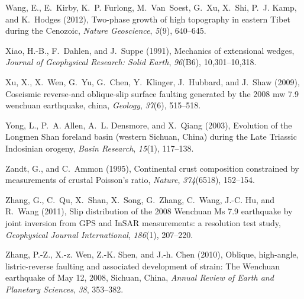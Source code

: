 \documentclass[draft,jgrga]{AGUTeX}
\begin{document}
\begin{article}
\begin{thebibliography}{90}
Wang, E., E.~Kirby, K.~P. Furlong, M.~Van~Soest, G.~Xu, X.~Shi, P.~J. Kamp, and
  K.~Hodges (2012), Two-phase growth of high topography in eastern {T}ibet
  during the {C}enozoic, \textit{Nature Geoscience}, \textit{5}(9), 640--645.

Xiao, H.-B., F.~Dahlen, and J.~Suppe (1991), Mechanics of extensional wedges,
  \textit{Journal of Geophysical Research: Solid Earth}, \textit{96}(B6),
  10,301--10,318.

Xu, X., X.~Wen, G.~Yu, G.~Chen, Y.~Klinger, J.~Hubbard, and J.~Shaw (2009),
  Coseismic reverse-and oblique-slip surface faulting generated by the 2008 mw
  7.9 wenchuan earthquake, china, \textit{Geology}, \textit{37}(6), 515--518.

Yong, L., P.~A. Allen, A.~L. Densmore, and X.~Qiang (2003), Evolution of the
  {L}ongmen {S}han foreland basin (western {S}ichuan, {C}hina) during the
  {L}ate {T}riassic {I}ndosinian orogeny, \textit{Basin Research},
  \textit{15}(1), 117--138.

Zandt, G., and C.~Ammon (1995), Continental crust composition constrained by
measurements of crustal {P}oisson's ratio, \textit{Nature}, \textit{374}(6518),
  152--154.

Zhang, G., C.~Qu, X.~Shan, X.~Song, G.~Zhang, C.~Wang, J.-C. Hu, and R.~Wang
  (2011), Slip distribution of the 2008 {W}enchuan {M}s 7.9 earthquake by joint
  inversion from {G}{P}{S} and {I}n{S}{A}{R} measurements: a resolution test
  study, \textit{Geophysical Journal International}, \textit{186}(1), 207--220.

Zhang, P.-Z., X.-z. Wen, Z.-K. Shen, and J.-h. Chen (2010), Oblique,
  high-angle, listric-reverse faulting and associated development of strain:
  The {W}enchuan earthquake of {M}ay 12, 2008, {S}ichuan, {C}hina,
  \textit{Annual Review of Earth and Planetary Sciences}, \textit{38},
  353--382.

\end{thebibliography}


\end{article}
\end{document}
